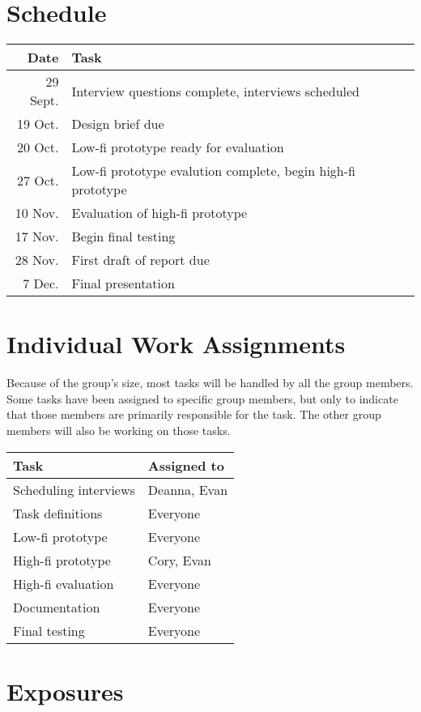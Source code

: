 \documentclass[11pt,letter]{article}
\begin{document}
\section{Schedule}
\begin{tabular}[!h]{rl}
	\textbf{Date} & \textbf{Task} \\
	\hline
	29 Sept. & Interview questions complete, interviews scheduled \\
	19 Oct.  & Design brief due \\
	20 Oct.  & Low-fi prototype ready for evaluation \\
	27 Oct.  & Low-fi prototype evalution complete, begin high-fi prototype \\
	10 Nov.  & Evaluation of high-fi prototype \\
	17 Nov.  & Begin final testing \\
	28 Nov.  & First draft of report due \\
	7 Dec.   & Final presentation
\end{tabular}

\section{Individual Work Assignments}
Because of the group's size, most tasks will be handled by all the group
members. Some tasks have been assigned to specific group members, but only to
indicate that those members are primarily responsible for the task. The other
group members will also be working on those tasks.

\hfill
\linebreak
\begin{tabular}[!h]{ll}
	\textbf{Task}         & \textbf{Assigned to} \\
	\hline
	Scheduling interviews & Deanna, Evan \\
	Task definitions      & Everyone \\
	Low-fi prototype      & Everyone \\
	High-fi prototype     & Cory, Evan \\
	High-fi evaluation    & Everyone \\
	Documentation         & Everyone \\
	Final testing         & Everyone
\end{tabular}

\section{Exposures}
\end{document}
